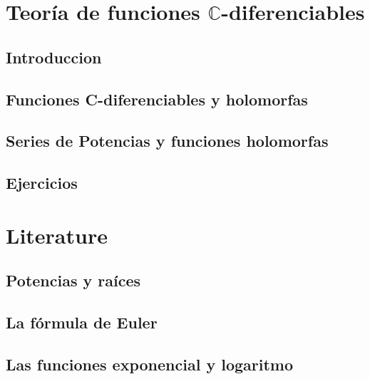 \documentclass[]{book}
\theoremstyle{definition}
\theoremstyle{definition}
\theoremstyle{definition}
\theoremstyle{remark}
\begin{document}
\hypertarget{teoruxeda-de-funciones-mathbbc-diferenciables}{%
\chapter{\texorpdfstring{Teoría de funciones \(\mathbb{C}\)-diferenciables}{Teoría de funciones \textbackslash{}mathbb\{C\}-diferenciables}}\label{teoruxeda-de-funciones-mathbbc-diferenciables}}

\hypertarget{introduccion}{%
\section{Introduccion}\label{introduccion}}

\hypertarget{funciones-c-diferenciables-y-holomorfas}{%
\section{Funciones C-diferenciables y holomorfas}\label{funciones-c-diferenciables-y-holomorfas}}

\hypertarget{series-de-potencias-y-funciones-holomorfas}{%
\section{Series de Potencias y funciones holomorfas}\label{series-de-potencias-y-funciones-holomorfas}}

\hypertarget{ejercicios-1}{%
\section{Ejercicios}\label{ejercicios-1}}

\hypertarget{literature}{%
\chapter{Literature}\label{literature}}

\hypertarget{potencias-y-rauxedces}{%
\section{Potencias y raíces}\label{potencias-y-rauxedces}}

\hypertarget{la-fuxf3rmula-de-euler}{%
\section{La fórmula de Euler}\label{la-fuxf3rmula-de-euler}}

\hypertarget{las-funciones-exponencial-y-logaritmo}{%
\section{Las funciones exponencial y logaritmo}\label{las-funciones-exponencial-y-logaritmo}}
\end{document}
